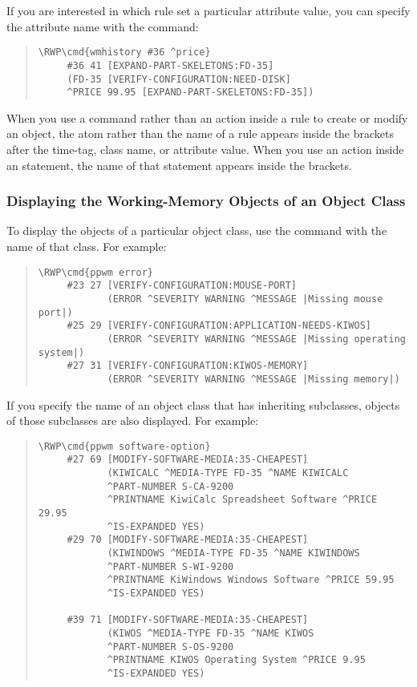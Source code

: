 If you are interested in which rule set a particular attribute value,
you can specify the attribute name with the  command:
\begin{quote}
\begin{Verbatim}[commandchars=\\\{\}]
\RWP\cmd{wmhistory #36 ^price}
     #36 41 [EXPAND-PART-SKELETONS:FD-35]
     (FD-35 [VERIFY-CONFIGURATION:NEED-DISK]
     ^PRICE 99.95 [EXPAND-PART-SKELETONS:FD-35])
\end{Verbatim}
\end{quote}

When you use a command rather than an action inside a rule to create
or modify an object, the atom  rather than the name of a rule
appears inside the brackets after the time-tag, class name, or
attribute value. When you use an action inside an  statement,
the name of that statement appears inside the brackets.

\subsubsection{Displaying the Working-Memory Objects of an Object
  Class}

To display the objects of a particular object class, use the 
command with the name of that class. For example:

\begin{quote}
\begin{Verbatim}[commandchars=\\\{\}]
\RWP\cmd{ppwm error}
     #23 27 [VERIFY-CONFIGURATION:MOUSE-PORT]
            (ERROR ^SEVERITY WARNING ^MESSAGE |Missing mouse port|)
     #25 29 [VERIFY-CONFIGURATION:APPLICATION-NEEDS-KIWOS]
            (ERROR ^SEVERITY WARNING ^MESSAGE |Missing operating system|)
     #27 31 [VERIFY-CONFIGURATION:KIWOS-MEMORY]
            (ERROR ^SEVERITY WARNING ^MESSAGE |Missing memory|)
\end{Verbatim}
\end{quote}

If you specify the name of an object class that has inheriting
subclasses, objects of those subclasses are also displayed. For
example:

\begin{quote}
\begin{Verbatim}[commandchars=\\\{\}]
\RWP\cmd{ppwm software-option}
     #27 69 [MODIFY-SOFTWARE-MEDIA:35-CHEAPEST]
            (KIWICALC ^MEDIA-TYPE FD-35 ^NAME KIWICALC
            ^PART-NUMBER S-CA-9200
            ^PRINTNAME KiwiCalc Spreadsheet Software ^PRICE 29.95
            ^IS-EXPANDED YES)
     #29 70 [MODIFY-SOFTWARE-MEDIA:35-CHEAPEST]
            (KIWINDOWS ^MEDIA-TYPE FD-35 ^NAME KIWINDOWS
            ^PART-NUMBER S-WI-9200
            ^PRINTNAME KiWindows Windows Software ^PRICE 59.95
            ^IS-EXPANDED YES)

     #39 71 [MODIFY-SOFTWARE-MEDIA:35-CHEAPEST]
            (KIWOS ^MEDIA-TYPE FD-35 ^NAME KIWOS 
            ^PART-NUMBER S-OS-9200
            ^PRINTNAME KIWOS Operating System ^PRICE 9.95 
            ^IS-EXPANDED YES)
\end{Verbatim}
\end{quote}

